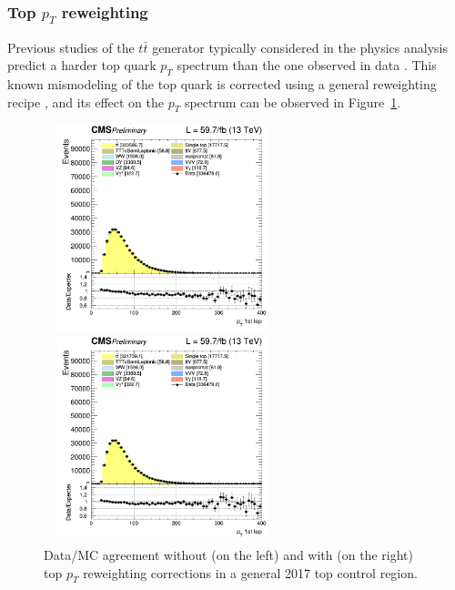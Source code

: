\documentclass[a4paper, 10pt, openright]{report}
\begin{document}
\subsubsection{Top $p_T$ reweighting} \label{subsection:toppt}

Previous studies of the $t \bar t$ generator typically considered in the physics analysis predict a harder top quark $p_T$ spectrum than the one observed in data \cite{topPt}. This known mismodeling of the top quark is corrected using a general reweighting recipe \cite{TopPtRecipe}, and its effect on the $p_T$ spectrum can be observed in Figure~\ref{fig:Toppt}.

\begin{figure}[htbp]
\begin{center}
\begin{minipage}[b]{.48\textwidth}
\includegraphics[width=7cm, height=6cm]{figs/cratio_topCR_df_2j_pt1_without.png}
\end{minipage} \hfill
\begin{minipage}[b]{.48\textwidth}
\includegraphics[width=7cm, height=6cm]{figs/cratio_topCR_df_2j_pt1_with.png}
\end{minipage} \hfill
\caption{Data/\ac{MC} agreement without (on the left) and with (on the right) top $p_T$ reweighting corrections in a general 2017 top control region.}
\label{fig:Toppt}
\end{center}
\end{figure}
\end{document}
